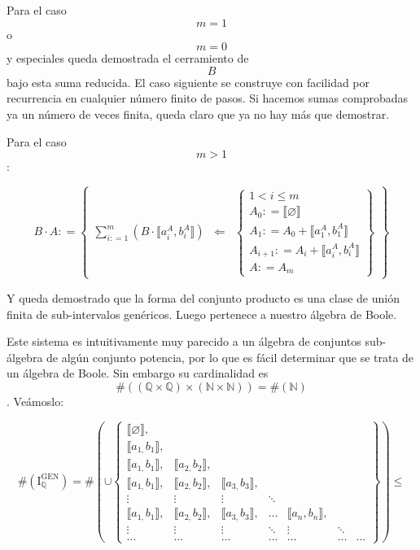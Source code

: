 \begin{enumerate}
  Para el caso \[m = 1\] o \[m = 0\] y especiales queda demostrada el
  cerramiento de \[B\]bajo esta suma reducida. El caso siguiente se
  construye con facilidad por recurrencia en cualquier número finito de
  pasos. Si hacemos sumas comprobadas ya un número de veces finita,
  queda claro que ya no hay más que demostrar.

  Para el caso \[m > 1\]:

  \[{{B \cdot A}{: =}}\begin{Bmatrix}
  {\sum\limits_{i{: = 1}}^{m}\left( {B \cdot {⟦{a_{i}^{A},b_{i}^{A}}⟧}} \right)} & \Leftarrow & \begin{Bmatrix}
  {{1 < i} \leq m} \\
  {A_{0}{: = {⟦\varnothing ⟧}}} \\
  {A_{1}{: = {A_{0} + {⟦{a_{1}^{A},b_{1}^{A}}⟧}}}} \\
  {A_{i + 1}{: = {A_{i} + {⟦{a_{i}^{A},b_{i}^{A}}⟧}}}} \\
  {A{: = A_{m}}}
  \end{Bmatrix}
  \end{Bmatrix}\]

  Y queda demostrado que la forma del conjunto producto es una clase de
  unión finita de sub-intervalos genéricos. Luego pertenece a nuestro
  álgebra de Boole.

  Este sistema es intuitivamente muy parecido a un álgebra de conjuntos
  sub-álgebra de algún conjunto po\-tencia, por lo que es fácil
  determinar que se trata de un álgebra de Boole. Sin embargo su
  cardinalidad es
  \[\#{\left( {\left( {\mathbb{Q} \times \mathbb{Q}} \right) \times \left( {\mathbb{N} \times \mathbb{N}} \right)} \right) = \#}\left( \mathbb{N} \right)\].
  Veámoslo:

  \[{{\#\left( \mathbf{\mathrm{I}}_{\mathbb{Q}}^{\mathbf{\mathrm{GEN}}} \right)} = {\#\left( {\mathbf{\mathrm{\cup}}\begin{Bmatrix}
  {{⟦\varnothing ⟧},} & & & & & & \\
  {{⟦{a_{1,}b_{1}}⟧},} & & & & & & \\
  {{⟦{a_{1,}b_{1}}⟧},} & {{⟦{a_{2,}b_{2}}⟧},} & & & & & \\
  {{⟦{a_{1,}b_{1}}⟧},} & {{⟦{a_{2,}b_{2}}⟧},} & {{⟦{a_{3,}b_{3}}⟧},} & & & & \\
   \vdots & \vdots & \vdots & \ddots & & & \\
  {{⟦{a_{1,}b_{1}}⟧},} & {{⟦{a_{2,}b_{2}}⟧},} & {{⟦{a_{3,}b_{3}}⟧},} & \ldots & {{⟦{a_{n},b_{n}}⟧},} & & \\
   \vdots & \vdots & \vdots & \ddots & \vdots & \ddots & \\
  \ldots & \ldots & \ldots & \ldots & \ldots & \ldots & \ldots
  \end{Bmatrix}} \right)}} \leq\]


\end{enumerate}
